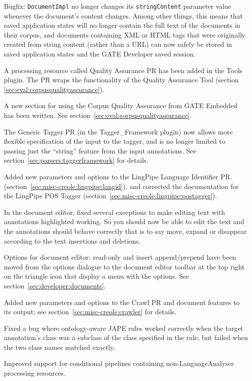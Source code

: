 Bugfix: {\tt DocumentImpl} no longer changes its {\tt stringContent} parameter
value whenever the document's content changes.  Among other things, this means
that saved application states will no longer contain the full text of the
documents in their corpus, and documents containing XML or HTML tags that were
originally created from string content (rather than a URL) can now safely be
stored in saved application states and the GATE Developer saved session.

A processing resource called Quality Assurance PR has been added in the Tools
plugin. The PR wraps the functionality of the Quality Assurance Tool 
(section \ref{sec:eval:corpusqualityassurance}).

A new section for using the Corpus Quality Assurance from GATE Embedded has
been written. See section~\ref{sec:eval:corpusqualityassurance}.

The Generic Tagger PR (in the Tagger\_Framework plugin) now allows more
flexible specification of the input to the tagger, and is no longer limited to
passing just the ``string'' feature from the input annotations.  See
section~\ref{sec:parsers:taggerframework} for details.

Added new parameters and options to the LingPipe Language Identifier PR.
(section~\ref{sec:misc-creole:lingpipe:langid}), and corrected the
documentation for the LingPipe POS Tagger
(section~\ref{sec:misc-creole:lingpipe:postagger}).

In the document editor, fixed several exceptions to make editing text with
annotations highlighted working. So you should now be able to edit the text
and the annotations should behave correctly that is to say move, expand or
disappear according to the text insertions and deletions.

Options for document editor: read-only and insert append/prepend have been
moved from the options dialogue to the document editor toolbar at the top
right on the triangle icon that display a menu with the options. See
section~\ref{sec:developer:documents}.

Added new parameters and options to the Crawl PR and document features to its
output; see section~\ref{sec:misc-creole:crawler} for details.

Fixed a bug where ontology-aware JAPE rules worked correctly when the target
annotation's class was a subclass of the class specified in the rule, but
failed when the two class names matched exactly.

Improved support for conditional pipelines containing non-LanguageAnalyser
processing resources.

